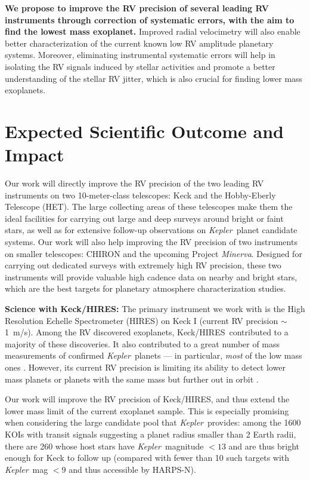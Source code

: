 \documentclass[12pt]{article}
\def\mps{m/s}
\def\kepler{{\it Kepler}}
\def\minerva{{\it Minerva}}
\def\keck{Keck/HIRES}
\begin{document}
\textbf{We propose to improve the RV precision of several leading RV
  instruments through correction of systematic errors, with the aim to
  find the lowest mass exoplanet.} Improved radial velocimetry will
also enable better characterization of the current known low RV
amplitude planetary systems. Moreover, eliminating instrumental
systematic errors will help in isolating the RV signals induced by
stellar activities and promote a better understanding of the stellar
RV jitter, which is also crucial for finding lower mass exoplanets.


\vspace{-3pt}
\section{Expected Scientific Outcome and Impact}

Our work will directly improve the RV precision of the two leading RV
instruments on two 10-meter-class telescopes: Keck and the
Hobby-Eberly Telescope (HET). The large collecting areas of these
telescopes make them the ideal facilities for carrying out large and
deep surveys around bright or faint stars, as well as for extensive
follow-up observations on \kepler\ planet candidate systems. Our work
will also help improving the RV precision of two
instruments on smaller telescopes: CHIRON and the upcoming Project
\minerva. Designed for carrying out dedicated surveys with extremely
high RV precision, these two instruments will provide valuable high
cadence data on nearby and bright stars, which are the best targets
for planetary atmosphere characterization studies.

\textbf{Science with \keck: } The primary instrument we work with is
the High Resolution Echelle Spectrometer (HIRES) on Keck I (current RV
precision $\sim$1~\mps). Among the RV discovered exoplanets,
\keck\ contributed to a majority of these discoveries. It also
contributed to a great number of mass measurements of confirmed
\kepler\ planets --- in particular, \textit{most} of the low mass ones
\citep[e.g.,][]{gautier2012,gilliland2013,howard2013,marcy2014}. However,
its current RV precision is limiting its ability to detect lower mass
planets or planets with the same mass but further out in orbit
\citep[e.g.,][]{marcy2014}.

Our work will improve the RV precision of \keck, and thus extend the
lower mass limit of the current exoplanet sample. This is especially
promising when considering the large candidate pool that
\kepler\ provides: among the 1600 KOIs with transit signals suggesting
a planet radius smaller than 2 Earth radii, there are 260 whose host
stars have \kepler\ magnitude $< 13$ and are thus bright enough for
Keck to follow up (compared with fewer than 10 such targets with
\kepler\ mag $< 9$ and thus accessible by HARPS-N).
\end{document}
